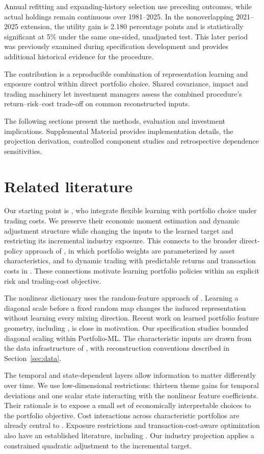 \documentclass[12pt,letterpaper,fleqn]{article}
\begin{document}
Annual refitting and expanding-history selection use preceding outcomes, while actual holdings remain continuous over 1981--2025. In the nonoverlapping 2021--2025 extension, the utility gain is 2.180 percentage points and is statistically significant at 5\% under the same one-sided, unadjusted test. This later period was previously examined during specification development and provides additional historical evidence for the procedure.

The contribution is a reproducible combination of representation learning and exposure control within direct portfolio choice. Shared covariance, impact and trading machinery let investment managers assess the combined procedure's return--risk--cost trade-off on common reconstructed inputs.

The following sections present the methods, evaluation and investment implications. Supplemental Material provides implementation details, the projection derivation, controlled component studies and retrospective dependence sensitivities.



\section{Related literature}
Our starting point is \citet{jensen2026}, who integrate flexible learning with portfolio choice under trading costs. We preserve their economic moment estimation and dynamic adjustment structure while changing the inputs to the learned target and restricting its incremental industry exposure. This connects to the broader direct-policy approach of \citet{brandt2009}, in which portfolio weights are parameterized by asset characteristics, and to dynamic trading with predictable returns and transaction costs in \citet{garleanu2013}. These connections motivate learning portfolio policies within an explicit risk and trading-cost objective.

The nonlinear dictionary uses the random-feature approach of \citet{rahimi2007}. Learning a diagonal scale before a fixed random map changes the induced representation without learning every mixing direction. Recent work on learned portfolio feature geometry, including \citet{fan2026}, is close in motivation. Our specification studies bounded diagonal scaling within Portfolio-ML. The characteristic inputs are drawn from the data infrastructure of \citet{jensen2023}, with reconstruction conventions described in Section~\ref{sec:data}.

The temporal and state-dependent layers allow information to matter differently over time. We use low-dimensional restrictions: thirteen theme gains for temporal deviations and one scalar state interacting with the nonlinear feature coefficients. Their rationale is to expose a small set of economically interpretable choices to the portfolio objective. Cost interactions across characteristic portfolios are already central to \citet{demiguel2020}. Exposure restrictions and transaction-cost-aware optimization also have an established literature, including \citet{lobo2007}. Our industry projection applies a constrained quadratic adjustment to the incremental target.
\end{document}
